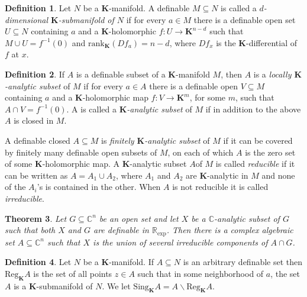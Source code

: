 \documentclass{amsart}
\newtheorem{theorem}{Theorem}[subsection]
\theoremstyle{definition}
\newtheorem{definition}[theorem]{Definition}
\numberwithin{equation}{section}
\begin{document}
\begin{definition}
  Let $N$ be a $\mathbf{K}$-manifold.
  A definable $M \subseteq N$ is called a \emph{$d$-dimensional $\mathbf{K}$-submanifold of $N$} if for every $a\in M$ there is a definable open set $U \subseteq N$ containing $a$ and a $\mathbf{K}$-holomorphic $f: U \to \mathbf{K}^{n-d}$ such that $M \cup U = f^{-1}(0)$ and $\mathrm{rank}_{\mathbf{K}}(Df_a) = n-d$,
  where $Df_x$ is the $\mathbf{K}$-differential of $f$ at $x$.
\end{definition}

\begin{definition}
  If $A$ is a definable subset of a $\mathbf{K}$-manifold $M$,
  then $A$ is a \emph{locally $\mathbf{K}$-analytic subset} of $M$
  if for every $a\in A$ there is a definable open $V \subseteq M$ containing $a$ and a $\mathbf{K}$-holomorphic map $f : V \to \mathbf{K}^m$,
  for some $m$, such that $A\cap V= f^{-1}(0)$.
  A is called a \emph{$\mathbf{K}$-analytic subset} of $M$ if in addition to the above $A$ is closed in $M$.

  A definable closed $A \subseteq M$ is \emph{finitely $\mathbf{K}$-analytic subset} of $M$ if it can be covered by finitely many definable open subsets of $M$,
  on each of which $A$ is the zero set of some $\mathbf{K}$-holomorphic map.
  A $\mathbf{K}$-analytic subset $A $of $M$ is called \emph{reducible} if it can be written as $A= A_1 \cup A_2$,
  where $A_1$ and $A_2$ are $\mathbf{K}$-analytic in $M$ and none of the $A_i$'s is contained in the other.
  When $A$ is not reducible it is called \emph{irreducible}.
\end{definition}

\begin{theorem}
  Let $G \subseteq \mathbb{C}^n$ be an open set and let $X$ be a $\mathbb{C}$-analytic subset of $G$ such that both $X$ and $G$ are definable in $\mathbb{R}_{\exp}$.
  Then there is a complex algebraic set $A \subseteq \mathbb{C}^n$ such that $X$ is the union of several irreducible components of $A\cap G$.
\end{theorem}

\begin{definition}
  Let $N$ be a $\mathbf{K}$-manifold.
  If $A \subseteq N$ is an arbitrary definable set then $\mathrm{Reg}_{\mathbf{K}}A$ is the set of all points $z \in A$ such that in some neighborhood of $a$,
  the set $A$ is a $\mathbf{K}$-submanifold of $N$.
  We let $\mathrm{Sing}_{\mathbf{K}}A = A \backslash \mathrm{Reg}_{\mathbf{K}}A$.
\end{definition}
\end{document}
